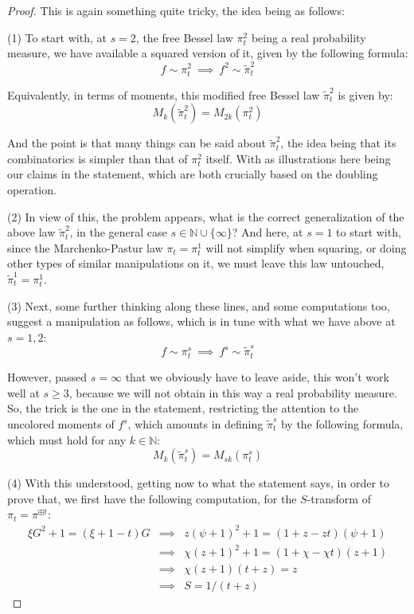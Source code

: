 \documentclass[12pt]{amsbook}
\begin{document}
\begin{proof}
This is again something quite tricky, the idea being as follows:

\medskip

(1) To start with, at $s=2$, the free Bessel law $\pi^2_t$ being a real probability measure, we have available a squared version of it, given by the following formula:
$$f\sim\pi^2_t\ \implies\ f^2\sim\tilde{\pi}^2_t$$

Equivalently, in terms of moments, this modified free Bessel law $\tilde{\pi}^2_t$ is given by:
$$M_k(\tilde{\pi}^2_t)=M_{2k}(\pi^2_t)$$

And the point is that many things can be said about $\tilde{\pi}^2_t$, the idea being that its combinatorics is simpler than that of $\pi^2_t$ itself. With as illustrations here being our claims in the statement, which are both crucially based on the doubling operation.

\medskip

(2) In view of this, the problem appears, what is the correct generalization of the above law $\tilde{\pi}^2_t$, in the general case $s\in\mathbb N\cup\{\infty\}$? And here, at $s=1$ to start with, since the Marchenko-Pastur law $\pi_t=\pi_t^1$ will not simplify when squaring, or doing other types of similar manipulations on it, we must leave this law untouched, $\tilde{\pi}^1_t=\pi^1_t$.

\medskip

(3) Next, some further thinking along these lines, and some computations too, suggest a manipulation as follows, which is in tune with what we have above at $s=1,2$:
$$f\sim\pi^s_t\ \implies\ f^s\sim\tilde{\pi}^s_t$$

However, passed $s=\infty$ that we obviously have to leave aside, this won't work well at $s\geq3$, because we will not obtain in this way a real probability measure. So, the trick is the one in the statement, restricting the attention to the uncolored moments of $f^s$, which amounts in defining $\tilde{\pi}^s_t$ by the following formula, which must hold for any $k\in\mathbb N$:
$$M_k(\tilde{\pi}^s_t)=M_{sk}(\pi^s_t)$$

(4) With this understood, getting now to what the statement says, in order to prove that, we first have the following computation, for the $S$-transform of $\pi_t=\pi^{\boxplus t}$:
\begin{eqnarray*}
\xi G^2+1=(\xi+1-t)G
&\implies&z(\psi+1)^2+1=(1+z-zt)(\psi+1)\\
&\implies&\chi(z+1)^2+1=(1+\chi-\chi t)(z+1)\\
&\implies&\chi(z+1)(t+z)=z\\
&\implies&S=1/(t+z)
\end{eqnarray*}


\end{proof}
\end{document}
